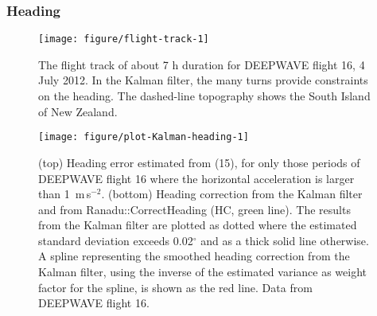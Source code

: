 \documentclass[12pt,twoside,english,12pt,twoside,english]{article}\usepackage[]{graphicx}\usepackage[]{color}
\makeatletter
\def\maxwidth{ %
  \ifdim\Gin@nat@width>\linewidth
    \linewidth
  \else
    \Gin@nat@width
  \fi
}
\newenvironment{knitrout}{}{} %
\makeatother
\begin{document}
\subsubsection{Heading}

\begin{knitrout}
\color{fgcolor}\begin{figure}

{\centering \texttt{[image: figure/flight-track-1]} 

}

\caption[The flight track of about 7 h duration for DEEPWAVE flight 16, 4 July 2012.]{The flight track of about 7 h duration for DEEPWAVE flight 16, 4 July 2012. In the Kalman filter, the many turns provide constraints on the heading. The dashed-line topography shows the South Island of New Zealand.}\label{fig:flight-track}
\end{figure}


\end{knitrout}

\begin{knitrout}
\color{fgcolor}\begin{figure}

{\centering \texttt{[image: figure/plot-Kalman-heading-1]} 

}

\caption[Heading error estimated from Eqn.\ 15 (top), and the results from the Kalman filter and a simplified estimate of the error in heading (bottom).]{(top) Heading error estimated from (15), for only those periods of DEEPWAVE flight 16 where the horizontal acceleration is larger than 1\ m\,s$^{-2}$. (bottom) Heading correction from the Kalman filter and from Ranadu::CorrectHeading (HC, green line). The results from the Kalman filter are plotted as dotted where the estimated standard deviation exceeds 0.02$^{\circ}$ and as a thick solid line otherwise. A spline representing the smoothed heading correction from the Kalman filter, using the inverse of the estimated variance as weight factor for the spline, is shown as the red line. Data from DEEPWAVE flight 16.}\label{fig:plot-Kalman-heading}
\end{figure}


\end{knitrout}
\end{document}
